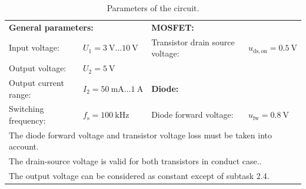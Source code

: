 \begin{table}[ht]
	\centering  %
	\begin{tabular}{llll}
		\toprule
		\multicolumn{2}{l}{\textbf{General parameters:}} & \multicolumn{2}{l}{\textbf{MOSFET:}}                                                                                                          \\
		Input voltage:                                   & $U_{\mathrm{1}} = \SI{3}{\volt} \ldots \SI{10}{\volt}$           & Transistor drain source voltage:    & $u_\mathrm{ds,on} = \SI{0.5}{\volt}$ \\
		Output voltage:                                  & $U_{\mathrm{2}} = \SI{5}{\volt}$                                 &                                     &                                      \\
		Output current range:                            & $I_{\mathrm{2}} = \SI{50}{\milli\ampere} \ldots \SI{1}{\ampere}$ & \multicolumn{2}{l}{\textbf{Diode:}}                                        \\
		Switching frequency:                             & $f_\mathrm{s} = \SI{100}{\kilo\hertz}$                           & Diode forward voltage:              & $u_\mathrm{fw} = \SI{0.8}{\volt}$    \\
		\midrule
		\multicolumn{4}{l}{\quad The diode forward voltage and transistor voltage loss must be taken into account.}                                                                                      \\
		\multicolumn{4}{l}{\quad The drain-source voltage is valid for both transistors in conduct case..}                                                                                               \\
		\multicolumn{4}{l}{\quad The output voltage can be considered as constant except of subtask 2.4.}                                                                                                \\
		\bottomrule
	\end{tabular}
	\caption{Parameters of the circuit.}  %
	\label{table:ex02_Parameters of the buck-boost converter}
\end{table}


